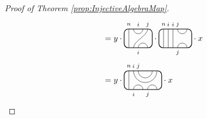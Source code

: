 \documentclass[11pt]{article}
\theoremstyle{plain}
\theoremstyle{definition}
\newcommand{\TLPlusPIso}[3]{
	\TLTStart
	\TLTThrough{#1}
	\TLTSnakeR{#2}{#3}
	\TLTEnd
}
\newcommand{\TLCapJoin}[5]{
	\TLTStart
	\TLTThrough{#1}
	\TLTCapJoin{#2}{#3}{#4}{#5}
	\TLTEnd
}
\newcommand{\TLTCalcLabelOffset}[3][0cm]{
	\settowidth{#2}{\scriptsize{$#3$}}
	\setlength{#2}{.5#2}
	\setlength{#2}{\maxof{#2}{#1}}
}
\newcommand{\TLTEnd}{
	\draw[thick, rounded corners = 5pt] (0,0) rectangle ($ (TLTlead) + (0,.8) $);
 \end{tikzpicture}
}
\newcommand{\TLTStart}{
 \begin{tikzpicture}[baseline=.3cm]
	\coordinate (TLTlead) at (.2,0); %
	\let\TLTlabelwidth\relax
	\newlength{\TLTlabelwidth}
}
\newcommand{\TLTThrough}[1]{
	\TLTCalcLabelOffset[.2cm]{\TLTlabelwidth}{#1}
	\coordinate (TLTlead) at ($ (TLTlead) + ({\TLTlabelwidth},0) $);
	\begin{scope}[shift=(TLTlead)]
		\draw (0,0) -- (0,.8);
		\node at (0,1) {\scriptsize{$#1$}};
	\end{scope}
		\coordinate (TLTlead) at ($ (TLTlead) + ({\TLTlabelwidth},0) $);
}
\newcommand{\TLTCapcup}[1]{
	\TLTCalcLabelOffset[.2cm]{\TLTlabelwidth}{#1}
		\coordinate (TLTlead) at ($ (TLTlead) + ({\TLTlabelwidth},0) $);
	\begin{scope}[shift=(TLTlead)]
		\draw (0,0) arc (180:0:.2);
		\draw (0,.8) arc (-180:0:.2);
		\node at (0,1) {\scriptsize{$#1$}};
	\end{scope}
	\TLTCalcLabelOffset[.5cm]{\TLTlabelwidth}{#1}
	\coordinate (TLTlead) at ($ (TLTlead) + ({\TLTlabelwidth},0)$);
}
\newcommand{\TLTSnakeR}[2]{
	\let\TLTscwidth\relax
	\newlength{\TLTscwidth}
	\let\TLTsswidth\relax
	\newlength{\TLTsswidth}
	\TLTCalcLabelOffset[.2cm]{\TLTscwidth}{#1}
	\TLTCalcLabelOffset[.5cm]{\TLTsswidth}{#2}
	\setlength{\TLTlabelwidth}{\TLTscwidth+\TLTsswidth}
	\setlength{\TLTlabelwidth}{\maxof{\TLTlabelwidth}{.7cm}} %
	\coordinate (TLTlead) at ($ (TLTlead) + ({\TLTscwidth},0) $);
	\begin{scope}[shift=(TLTlead)]
		\draw (.1,.8) arc (-180:0:.2cm);
		\draw (.1,0) .. controls ++(90:.3cm) and ++(270:.3cm) .. ($ (.1,.8) + ({\TLTlabelwidth},0) $);
		\draw ($ (.1,0) + ({\TLTsswidth},0) $) arc (180:0:.2cm);
		\node at (.1,1) {\scriptsize{$#1$}};
		\node at ($ (.1,1) + ({\TLTlabelwidth},0) $) {\scriptsize{$#2$}};
		\node at ($ (.1,-.2) + ({\TLTsswidth},0) $) {\scriptsize{$#1$}};
	\end{scope}
	\coordinate (TLTlead) at ($ (TLTlead) + ({\TLTlabelwidth+\TLTsswidth},0) $);
}
\newcommand{\TLTCapJoin}[4]{
	\let\TLTjoinlwidth\relax
	\newlength{\TLTjoinlwidth}
	\let\TLTjoinrwidth\relax
	\newlength{\TLTjoinrwidth}
	\let\TLTsplitlwidth\relax
	\newlength{\TLTsplitlwidth}
	\let\TLTsplitrwidth\relax
	\newlength{\TLTsplitrwidth}
	\TLTCalcLabelOffset[.8cm]{\TLTjoinrwidth}{#4} %
	\TLTCalcLabelOffset[.15cm]{\TLTjoinlwidth}{#3} %
	\TLTCalcLabelOffset[.6cm]{\TLTsplitlwidth}{#1}
	\TLTCalcLabelOffset[.6cm]{\TLTsplitrwidth}{#2}
	\setlength{\TLTlabelwidth}{\maxof{\TLTjoinlwidth}{\TLTsplitlwidth}}
	\coordinate (TLTlead) at ($ (TLTlead) + ({\TLTlabelwidth},0) $);
	\setlength{\TLTlabelwidth}{\maxof{\TLTjoinrwidth}{\TLTsplitrwidth}} %
 \begin{scope}[shift=(TLTlead)]
		\draw (0,.8) arc (-180:0:.5);
		\draw (0.2,.8) arc (-180:0:.3);
		\draw (0,0) arc (180:0:.2);
		\draw ({\TLTsplitlwidth},0) arc (180:0:.2);
		\node at (0,1) {\scriptsize{$#4$}};
		\node at ({\TLTjoinlwidth},1) {\scriptsize{$#3$}};
		\node at (0,-.2) {\scriptsize{$#1$}};
		\node at ({\TLTsplitlwidth},-.2) {\scriptsize{$#2$}};
	\end{scope}
	\coordinate (TLTlead) at ($ (TLTlead) + ({\TLTlabelwidth},0) $);
}
\begin{document}
\begin{proof}[Proof of Theorem \ref{prop:InjectiveAlgebraMap}]
\begin{align*}
\begin{tikzpicture}[baseline=.3cm]
	\end{tikzpicture}
	&= y\cdot
	\begin{tikzpicture}[baseline=.3cm]
		\draw (.2,0) -- (.2,.8);
		\node at (.2,1) {\scriptsize{$n$}};
		\draw (.6,0) arc (180:0:.2cm);
		\node at (.6,-.2) {\scriptsize{$i$}};
		\draw (.4,0) .. controls ++(90:.3cm) and ++(270:.3cm) .. (1,.8);
		\node at (1,1) {\scriptsize{$j$}};
		\draw (.4,.8) arc (-180:0:.2cm);
		\node at (.6,1) {\scriptsize{$i$}};
		\draw[thick, rounded corners = 5pt] (0,0) rectangle (1.2,.8);
	\end{tikzpicture}
	\cdot
	\begin{tikzpicture}[baseline=.3cm]
		\draw (.2,0) -- (.2,.8);
		\node at (.2,1) {\scriptsize{$n$}};
		\draw (.4,0) -- (.4,.8);
		\node at (.4,1) {\scriptsize{$i$}};
		\draw (.6,0) -- (.6,.8);
		\node at (.6,1) {\scriptsize{$i$}};
		\draw (.8,0) arc (180:0:.2cm);
		\node at (.8,-.2) {\scriptsize{$j$}};
		\draw (.8,.8) arc (-180:0:.2cm);
		\node at (.8,1) {\scriptsize{$j$}};
		\draw[thick, rounded corners = 5pt] (0,0) rectangle (1.4,.8);
	\end{tikzpicture}
	\cdot x\\ %
	&= y\cdot 
	\begin{tikzpicture}[baseline=.3cm]
		\draw (.2,0) -- (.2,.8);
		\node at (.2,1) {\scriptsize{$n$}};
		\draw (.4,0) arc (180:0:.2cm);
		\node at (.4,-.2) {\scriptsize{$i$}};
		\draw (1,0) arc (180:0:.2cm);
		\node at (1,-.2) {\scriptsize{$j$}};
		\draw (.4,.8) arc (-180:0:.5cm);
		\node at (.4,1) {\scriptsize{$i$}};
		\draw (.6,.8) arc (-180:0:.3cm);
		\node at (.6,1) {\scriptsize{$j$}};
		\draw[thick, rounded corners = 5pt] (0,0) rectangle (1.6,.8);
	\end{tikzpicture}
	\cdot x %
\end{align*}

\end{proof}
\end{document}
